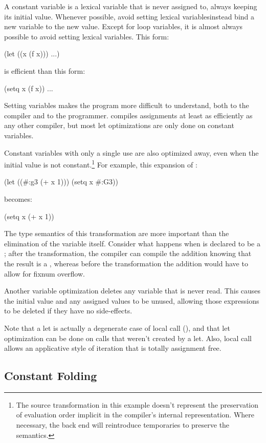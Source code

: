 A constant variable is a lexical variable that is never assigned to,
always keeping its initial value.  Whenever possible, avoid setting
lexical variables\dash{}instead bind a new variable to the new value.
Except for loop variables, it is almost always possible to avoid
setting lexical variables.  This form:
\begin{example}
(let ((x (f x)))
  ...)
\end{example}
is  efficient than this form:
\begin{example}
(setq x (f x))
...
\end{example}
Setting variables makes the program more difficult to understand, both
to the compiler and to the programmer.  \python{} compiles assignments
at least as efficiently as any other \llisp{} compiler, but most let
optimizations are only done on constant variables.

Constant variables with only a single use are also optimized away,
even when the initial value is not constant.\footnote{The source
  transformation in this example doesn't represent the preservation of
  evaluation order implicit in the compiler's internal representation.
  Where necessary, the back end will reintroduce temporaries to
  preserve the semantics.}  For example, this expansion of
:
\begin{lisp}
(let ((#:g3 (+ x 1)))
  (setq x #:G3))
\end{lisp}
becomes:
\begin{lisp}
(setq x (+ x 1))
\end{lisp}
The type semantics of this transformation are more important than the
elimination of the variable itself.  Consider what happens when
 is declared to be a ; after the transformation,
the compiler can compile the addition knowing that the result is a
, whereas before the transformation the addition would
have to allow for fixnum overflow.

Another variable optimization deletes any variable that is never read.
This causes the initial value and any assigned values to be unused,
allowing those expressions to be deleted if they have no side-effects.

Note that a let is actually a degenerate case of local call
(), and that let optimization can be done on calls
that weren't created by a let.  Also, local call allows an applicative
style of iteration that is totally assignment free.


\subsection{Constant Folding}

